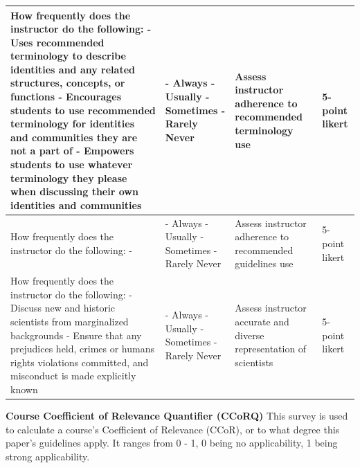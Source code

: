\documentclass[10pt, twocolumn]{article}
\begin{document}
\begin{xltabular}{\textwidth}{|p{0.3\textwidth}|p{0.3\textwidth}|p{0.2\textwidth}|X|}
    How frequently does the instructor do the following: \newline - Uses recommended terminology to describe identities and any related structures, concepts, or functions \newline - Encourages students to use recommended terminology for identities and communities they are not a part of \newline - Empowers students to use whatever terminology they please when discussing their own identities and communities & - Always \newline - Usually \newline - Sometimes \newline - Rarely \newline Never & Assess instructor adherence to recommended terminology use & 5-point likert \\ \hline
    How frequently does the instructor do the following: \newline -  & - Always \newline - Usually \newline - Sometimes \newline - Rarely \newline Never & Assess instructor adherence to recommended guidelines use & 5-point likert \\ \hline
    How frequently does the instructor do the following: \newline - Discuss new and historic scientists from marginalized backgrounds \newline - Ensure that any prejudices held, crimes or humans rights violations committed, and misconduct is made explicitly known & - Always \newline - Usually \newline - Sometimes \newline - Rarely \newline Never & Assess instructor accurate and diverse representation of scientists & 5-point likert \\ \hline

\end{xltabular}

\begin{instrument}
    \caption{\textbf{Course Coefficient of Relevance Quantifier (CCoRQ)} This survey is used to calculate a course's Coefficient of Relevance (CCoR), or to what degree this paper's guidelines apply. It ranges from 0 - 1, 0 being no applicability, 1 being strong applicability.} \label{inst:relevance-coeff}
\end{instrument}
\end{document}
